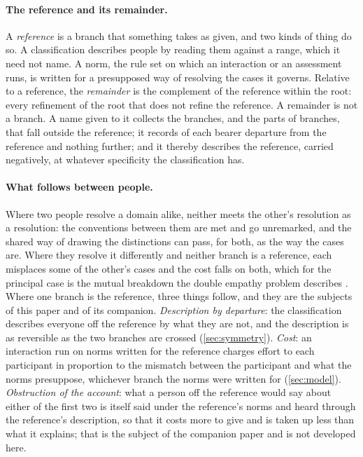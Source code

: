 \paragraph{The reference and its remainder.} A \emph{reference} is a branch that something takes as given, and two kinds of thing do so. A classification describes people by reading them against a range, which it need not name. A norm, the rule set on which an interaction or an assessment runs, is written for a presupposed way of resolving the cases it governs. Relative to a reference, the \emph{remainder} is the complement of the reference within the root: every refinement of the root that does not refine the reference. A remainder is not a branch. A name given to it collects the branches, and the parts of branches, that fall outside the reference; it records of each bearer departure from the reference and nothing further; and it thereby describes the reference, carried negatively, at whatever specificity the classification has.

\paragraph{What follows between people.} Where two people resolve a domain alike, neither meets the other's resolution as a resolution: the conventions between them are met and go unremarked, and the shared way of drawing the distinctions can pass, for both, as the way the cases are. Where they resolve it differently and neither branch is a reference, each misplaces some of the other's cases and the cost falls on both, which for the principal case is the mutual breakdown the double empathy problem describes \cite{Milton2012}. Where one branch is the reference, three things follow, and they are the subjects of this paper and of its companion. \emph{Description by departure}: the classification describes everyone off the reference by what they are not, and the description is as reversible as the two branches are crossed (\autoref{sec:symmetry}). \emph{Cost}: an interaction run on norms written for the reference charges effort to each participant in proportion to the mismatch between the participant and what the norms presuppose, whichever branch the norms were written for (\autoref{sec:model}). \emph{Obstruction of the account}: what a person off the reference would say about either of the first two is itself said under the reference's norms and heard through the reference's description, so that it costs more to give and is taken up less than what it explains; that is the subject of the companion paper \cite{Unconveyable} and is not developed here.

